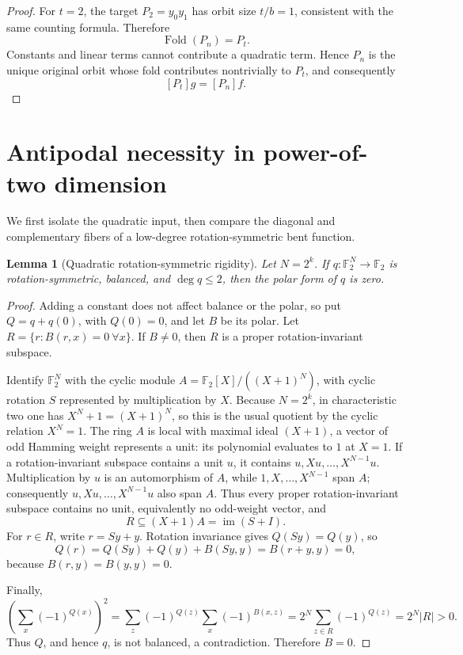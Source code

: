 \documentclass[11pt,a4paper]{article}
\newtheorem{lemma}[theorem]{Lemma}
\theoremstyle{remark}
\theoremstyle{plain}
\newcommand{\F}{\mathbb F_2}
\begin{document}
\begin{proof}
For $t=2$, the target $P_2=y_0y_1$ has orbit size $t/b=1$, consistent with the same counting formula. Therefore
\[
\operatorname{Fold}(P_n)=P_t.
\]
Constants and linear terms cannot contribute a quadratic term. Hence $P_n$ is the unique original orbit whose fold contributes nontrivially to $P_t$, and consequently
\[
[P_t]g=[P_n]f.
\]
\end{proof}


\section{Antipodal necessity in power-of-two dimension}

We first isolate the quadratic input, then compare the diagonal and complementary fibers of a low-degree rotation-symmetric bent function.

\begin{lemma}[Quadratic rotation-symmetric rigidity]\label{lem:quad-rigidity}
Let \(N=2^k\). If \(q:\F^N\to\F\) is rotation-symmetric, balanced, and \(\deg q\le2\), then the polar form of \(q\) is zero.
\end{lemma}
\begin{proof}
Adding a constant does not affect balance or the polar, so put \(Q=q+q(0)\), with \(Q(0)=0\), and let \(B\) be its polar. Let \(R=\{r:B(r,x)=0\ \forall x\}\). If \(B\ne0\), then \(R\) is a proper rotation-invariant subspace.

Identify \(\F^N\) with the cyclic module \(A=\F[X]/((X+1)^N)\), with cyclic rotation \(S\) represented by multiplication by \(X\). Because \(N=2^k\), in characteristic two one has \(X^N+1=(X+1)^N\), so this is the usual quotient by the cyclic relation \(X^N=1\). The ring \(A\) is local with maximal ideal \((X+1)\), a vector of odd Hamming weight represents a unit: its polynomial evaluates to \(1\) at \(X=1\). If a rotation-invariant subspace contains a unit \(u\), it contains \(u,Xu,\ldots,X^{N-1}u\). Multiplication by \(u\) is an automorphism of \(A\), while \(1,X,\ldots,X^{N-1}\) span \(A\); consequently \(u,Xu,\ldots,X^{N-1}u\) also span \(A\). Thus every proper rotation-invariant subspace contains no unit, equivalently no odd-weight vector, and
\[
R\subseteq (X+1)A=\operatorname{im}(S+I).
\]
For \(r\in R\), write \(r=Sy+y\). Rotation invariance gives \(Q(Sy)=Q(y)\), so
\[
Q(r)=Q(Sy)+Q(y)+B(Sy,y)=B(r+y,y)=0,
\]
because \(B(r,y)=B(y,y)=0\).

Finally,
\[
\left(\sum_x(-1)^{Q(x)}\right)^2
=\sum_{z}(-1)^{Q(z)}\sum_x(-1)^{B(x,z)}
=2^N\sum_{z\in R}(-1)^{Q(z)}
=2^N|R|>0.
\]
Thus \(Q\), and hence \(q\), is not balanced, a contradiction. Therefore \(B=0\).
\end{proof}
\end{document}
